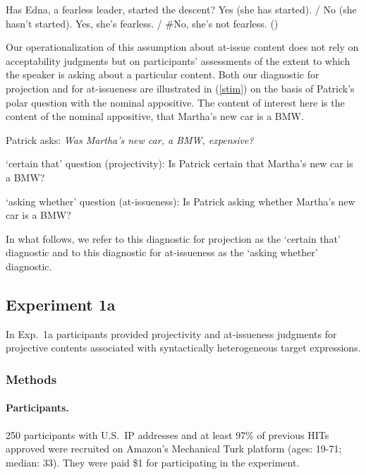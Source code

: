 \documentclass[11pt,fleqn]{article}
\newcommand{\6}{\mbox{$[\hspace*{-.6mm}[$}}
\newcommand{\9}{\mbox{$]\hspace*{-.6mm}]$}}
\def\infelic{{\leavevmode\llap{\#}}}
\begin{document}
\begin{exe}
\ex\label{edna}
\begin{xlist}
 Has Edna, a fearless leader, started the descent?
 Yes (she has started). / No (she hasn't started).
 \infelic Yes, she's fearless. / \#No, she's not fearless. \hfill (\citealt[731]{amaral-etal07})
\end{xlist}
\end{exe}
Our operationalization of this assumption about at-issue content does not rely on acceptability judgments but on participants' assessments of the extent to which the speaker is asking about a particular content. Both our diagnostic for projection and for at-issueness are illustrated in (\ref{stim}) on the basis of Patrick's polar question with the nominal appositive. The content of interest here is the content of the nominal appositive, that Martha's new car is a BMW. 
\begin{exe}

\ex\label{stim} Patrick asks: {\em Was Martha's new car, a BMW, expensive?} 

\begin{xlist}
\ex `certain that' question (projectivity): Is Patrick certain that Martha's new car is a BMW?

\ex `asking whether' question (at-issueness): Is Patrick asking whether Martha's new car is a BMW?

\end{xlist}

\end{exe}
In what follows, we refer to this diagnostic for projection as the `certain that' diagnostic and to this diagnostic for at-issueness as the `asking whether' diagnostic. 

\subsection{Experiment 1a}\label{s-exp1a}

In Exp.~1a participants provided projectivity and at-issueness judgments for projective contents associated with syntactically heterogeneous target expressions. 

\subsubsection{Methods}\label{s-methods-1a}

\paragraph{Participants.} 250 participants with U.S.\ IP addresses and at least 97\% of previous HITs approved were recruited on Amazon's Mechanical Turk platform (ages: 19-71; median: 33). They were paid \$1 for participating in the experiment. 
\end{document}
